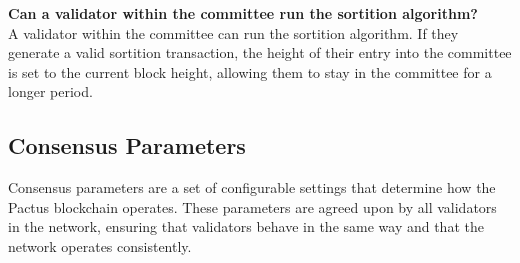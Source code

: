 \documentclass{novel}
\begin{document}
\noindent \textbf{Can a validator within the committee run the sortition algorithm?}\\
A validator within the committee can run the sortition algorithm. If they generate a valid sortition transaction, the height of their entry into the committee is set to the current block height, allowing them to stay in the committee for a longer period.

\subsection{Consensus Parameters}
Consensus parameters are a set of configurable settings that determine how the Pactus blockchain operates. These parameters are agreed upon by all validators in the network, ensuring that validators behave in the same way and that the network operates consistently.
\end{document}
